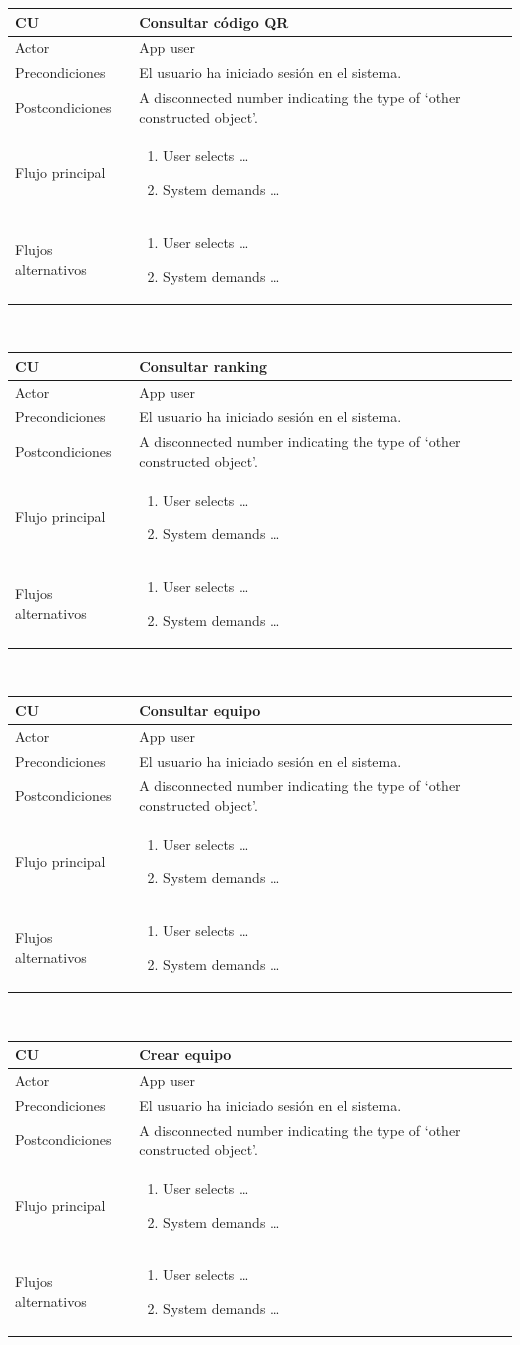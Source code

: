 \documentclass[twoside]{report}
\newcommand\addrow[2]{#1 &#2\\ }
\newcommand\addheading[2]{#1 &#2\\ \hline}
\newcommand\tabularhead{\begin{tabular}{lp{0.7\textwidth}}
\hline
}
\newcommand\addmulrow[2]{ \begin{minipage}[t][][t]{2.5cm}#1\end{minipage}%
   &\begin{minipage}[t][][t]{8cm}
    \begin{enumerate} #2   \end{enumerate}
    \end{minipage}\\ }
\newenvironment{usecase}{\tabularhead}
{\hline\end{tabular}}
\begin{document}
\begin{usecase}
  \addheading{\textbf{CU\arabic{usecase}}}{Consultar código QR} 
  \addrow{Actor}{App user}
  \addrow{Precondiciones}{El usuario ha iniciado sesión en el sistema.}
  \addrow{Postcondiciones}{A disconnected number indicating the type of `other constructed object'.}
  \addmulrow{Flujo principal}{
  		\item User selects \ldots
        \item System demands \ldots
  }
  \addmulrow{Flujos alternativos}{
  		\item User selects \ldots
        \item System demands \ldots
  }
\end{usecase}\\

\begin{usecase}
  \addheading{\textbf{CU\arabic{usecase}}}{Consultar ranking} 
  \addrow{Actor}{App user}
  \addrow{Precondiciones}{El usuario ha iniciado sesión en el sistema.}
  \addrow{Postcondiciones}{A disconnected number indicating the type of `other constructed object'.}
  \addmulrow{Flujo principal}{
  		\item User selects \ldots
        \item System demands \ldots
  }
  \addmulrow{Flujos alternativos}{
  		\item User selects \ldots
        \item System demands \ldots
  }
\end{usecase}\\

\begin{usecase}
  \addheading{\textbf{CU\arabic{usecase}}}{Consultar equipo} 
  \addrow{Actor}{App user}
  \addrow{Precondiciones}{El usuario ha iniciado sesión en el sistema.}
  \addrow{Postcondiciones}{A disconnected number indicating the type of `other constructed object'.}
  \addmulrow{Flujo principal}{
  		\item User selects \ldots
        \item System demands \ldots
  }
  \addmulrow{Flujos alternativos}{
  		\item User selects \ldots
        \item System demands \ldots
  }
\end{usecase}\\

\begin{usecase}
  \addheading{\textbf{CU\arabic{usecase}}}{Crear equipo} 
  \addrow{Actor}{App user}
  \addrow{Precondiciones}{El usuario ha iniciado sesión en el sistema.}
  \addrow{Postcondiciones}{A disconnected number indicating the type of `other constructed object'.}
  \addmulrow{Flujo principal}{
  		\item User selects \ldots
        \item System demands \ldots
  }
  \addmulrow{Flujos alternativos}{
  		\item User selects \ldots
        \item System demands \ldots
  }
\end{usecase}\\
\end{document}
